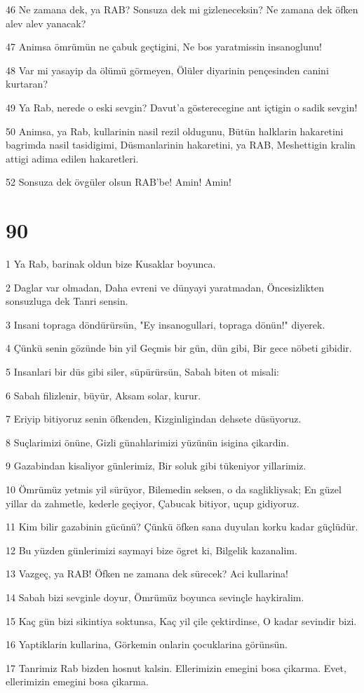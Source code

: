 \par 46 Ne zamana dek, ya RAB? Sonsuza dek mi gizleneceksin? Ne zamana dek öfken alev alev yanacak?
\par 47 Animsa ömrümün ne çabuk geçtigini, Ne bos yaratmissin insanoglunu!
\par 48 Var mi yasayip da ölümü görmeyen, Ölüler diyarinin pençesinden canini kurtaran?
\par 49 Ya Rab, nerede o eski sevgin? Davut'a gösterecegine ant içtigin o sadik sevgin!
\par 50 Animsa, ya Rab, kullarinin nasil rezil oldugunu, Bütün halklarin hakaretini bagrimda nasil tasidigimi, Düsmanlarinin hakaretini, ya RAB, Meshettigin kralin attigi adima edilen hakaretleri.
\par 52 Sonsuza dek övgüler olsun RAB'be! Amin! Amin!

\chapter{90}

\par 1 Ya Rab, barinak oldun bize Kusaklar boyunca.
\par 2 Daglar var olmadan, Daha evreni ve dünyayi yaratmadan, Öncesizlikten sonsuzluga dek Tanri sensin.
\par 3 Insani topraga döndürürsün, "Ey insanogullari, topraga dönün!" diyerek.
\par 4 Çünkü senin gözünde bin yil Geçmis bir gün, dün gibi, Bir gece nöbeti gibidir.
\par 5 Insanlari bir düs gibi siler, süpürürsün, Sabah biten ot misali:
\par 6 Sabah filizlenir, büyür, Aksam solar, kurur.
\par 7 Eriyip bitiyoruz senin öfkenden, Kizginligindan dehsete düsüyoruz.
\par 8 Suçlarimizi önüne, Gizli günahlarimizi yüzünün isigina çikardin.
\par 9 Gazabindan kisaliyor günlerimiz, Bir soluk gibi tükeniyor yillarimiz.
\par 10 Ömrümüz yetmis yil sürüyor, Bilemedin seksen, o da saglikliysak; En güzel yillar da zahmetle, kederle geçiyor, Çabucak bitiyor, uçup gidiyoruz.
\par 11 Kim bilir gazabinin gücünü? Çünkü öfken sana duyulan korku kadar güçlüdür.
\par 12 Bu yüzden günlerimizi saymayi bize ögret ki, Bilgelik kazanalim.
\par 13 Vazgeç, ya RAB! Öfken ne zamana dek sürecek? Aci kullarina!
\par 14 Sabah bizi sevginle doyur, Ömrümüz boyunca sevinçle haykiralim.
\par 15 Kaç gün bizi sikintiya soktunsa, Kaç yil çile çektirdinse, O kadar sevindir bizi.
\par 16 Yaptiklarin kullarina, Görkemin onlarin çocuklarina görünsün.
\par 17 Tanrimiz Rab bizden hosnut kalsin. Ellerimizin emegini bosa çikarma. Evet, ellerimizin emegini bosa çikarma.

